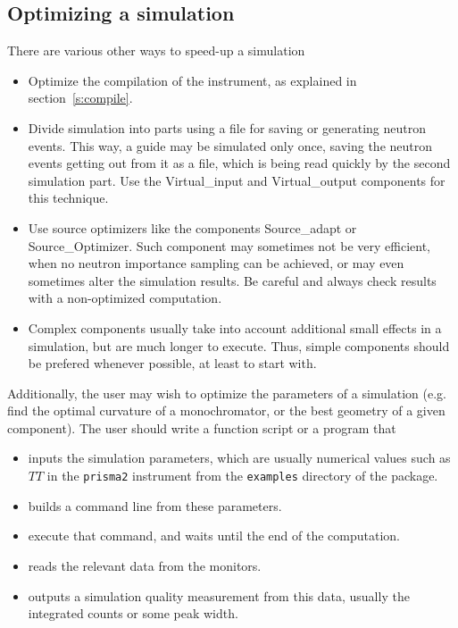 \subsection{Optimizing a simulation}
There are various other ways to speed-up a simulation
\begin{itemize}
\item Optimize the compilation of the instrument, as explained in section~\ref{s:compile}.
\item Divide simulation into parts using a file for saving or generating neutron
      events. This way, a guide may be simulated only once, saving the neutron events 
      getting out from it as a file, which is being read quickly by the second simulation 
      part. Use the Virtual\_input and Virtual\_output components for this technique.
\item Use source optimizers like the components Source\_adapt or
      Source\_Optimizer. Such component may sometimes not be very efficient, when no
      neutron importance sampling can be achieved, or may even sometimes alter the
      simulation results. Be careful and always check results with a non-optimized 
      computation.
\item Complex components usually take into account additional small effects in a simulation,
      but are much longer to execute. Thus, simple components should be prefered
      whenever possible, at least to start with. 
\end{itemize}

Additionally, the user may wish to optimize the parameters of a simulation (e.g. find the optimal curvature of a monochromator, or the best geometry of a given component). 
The user should write a function script or a program that
\begin{itemize}
\item inputs the simulation parameters, which are usually numerical values such as $TT$ in the \verb+prisma2+ instrument from the \verb+examples+ directory of the package.
\item builds a command line from these parameters.
\item execute that command, and waits until the end of the computation.
\item reads the relevant data from the monitors.
\item outputs a simulation quality measurement from this data, usually the integrated counts or some peak width.
\end{itemize}

